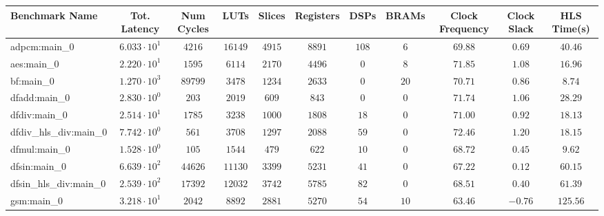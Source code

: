 \begin{tabular}{|l|c|c|c|c|c|c|c|c|c|c|}
\hline
Benchmark Name          & Tot. Latency           & Num Cycles & LUTs      & Slices    & Registers & DSPs    & BRAMs   & Clock Frequency & Clock Slack & HLS Time(s) \\
\hline
adpcm:main\_0           & $ 6.033 \cdot 10^{1} $ & $ 4216   $ & $ 16149 $ & $ 4915  $ & $ 8891  $ & $ 108 $ & $ 6   $ & $ 69.88       $ & $ 0.69    $ & $ 40.46   $ \\
aes:main\_0             & $ 2.220 \cdot 10^{1} $ & $ 1595   $ & $ 6114  $ & $ 2170  $ & $ 4496  $ & $ 0   $ & $ 8   $ & $ 71.85       $ & $ 1.08    $ & $ 16.96   $ \\
bf:main\_0              & $ 1.270 \cdot 10^{3} $ & $ 89799  $ & $ 3478  $ & $ 1234  $ & $ 2633  $ & $ 0   $ & $ 20  $ & $ 70.71       $ & $ 0.86    $ & $ 8.74    $ \\
dfadd:main\_0           & $ 2.830 \cdot 10^{0} $ & $ 203    $ & $ 2019  $ & $ 609   $ & $ 843   $ & $ 0   $ & $ 0   $ & $ 71.74       $ & $ 1.06    $ & $ 28.29   $ \\
dfdiv:main\_0           & $ 2.514 \cdot 10^{1} $ & $ 1785   $ & $ 3238  $ & $ 1000  $ & $ 1808  $ & $ 18  $ & $ 0   $ & $ 71.00       $ & $ 0.92    $ & $ 18.13   $ \\
dfdiv\_hls\_div:main\_0 & $ 7.742 \cdot 10^{0} $ & $ 561    $ & $ 3708  $ & $ 1297  $ & $ 2088  $ & $ 59  $ & $ 0   $ & $ 72.46       $ & $ 1.20    $ & $ 18.15   $ \\
dfmul:main\_0           & $ 1.528 \cdot 10^{0} $ & $ 105    $ & $ 1544  $ & $ 479   $ & $ 622   $ & $ 10  $ & $ 0   $ & $ 68.72       $ & $ 0.45    $ & $ 9.62    $ \\
dfsin:main\_0           & $ 6.639 \cdot 10^{2} $ & $ 44626  $ & $ 11130 $ & $ 3399  $ & $ 5231  $ & $ 41  $ & $ 0   $ & $ 67.22       $ & $ 0.12    $ & $ 60.15   $ \\
dfsin\_hls\_div:main\_0 & $ 2.539 \cdot 10^{2} $ & $ 17392  $ & $ 12032 $ & $ 3742  $ & $ 5785  $ & $ 82  $ & $ 0   $ & $ 68.51       $ & $ 0.40    $ & $ 61.39   $ \\
gsm:main\_0             & $ 3.218 \cdot 10^{1} $ & $ 2042   $ & $ 8892  $ & $ 2881  $ & $ 5270  $ & $ 54  $ & $ 10  $ & $ 63.46       $ & $ -0.76   $ & $ 125.56  $ \\

\end{tabular}
